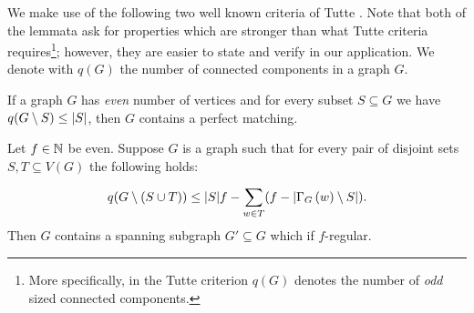 \documentclass[11pt]{article}
\begin{document}


We make use of the following two well known criteria of Tutte \cite{tutte1952factors, tutte1947factorization}. 
Note that both of the lemmata ask for properties which are stronger than what Tutte criteria requires\footnote{More specifically, in the Tutte criterion $q(G)$ denotes the number of \emph{odd} sized connected components.}; however, they are easier to state and verify in our application. We denote with $q(G)$ the number of connected components in a graph $G$.

\begin{lemma}\label{lemma:tutte-criterion}
If a graph $G$ has  \emph{even} number of vertices and for every subset $S \subseteq G$ we have $q(G \setminus S) \leq |S|$, then $G$ contains a perfect matching.
\end{lemma}

\begin{lemma}\label{lemma:tutte-criterion-factor}
  Let $f \in \mathbb{N}$ be even. Suppose $G$ is a graph such that for every pair of disjoint sets $S, T \subseteq V(G)$ the following holds:

  \[ q(G \setminus (S \cup T)) \le |S|f - \sum_{w \in T} (f - |\Gamma_{G}\left(w\right) \setminus S|). \]
  Then $G$ contains a spanning subgraph $G' \subseteq G$ which if $f$-regular.
\end{lemma}
\end{document}
